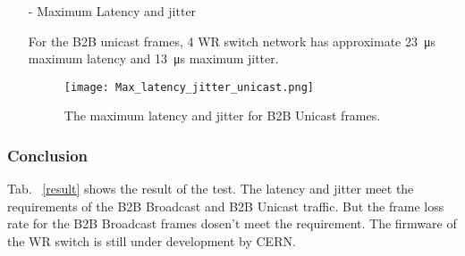 \begin{itemize}
\begin{itemize}
For the B2B Unicast frames, 4 WR switch network has approximate \SI{11}{\us} average latency and \SI{0}{\us} average jitter. 

\begin{figure}[H]
   \centering   
   \texttt{[image: Avg\_latency\_jitter\_unicast.png]}
   \caption{The average latency and jitter for B2B Unicast frames.}
   \label{Avg_latency_jitter_unicast}
\end{figure}

			\item[-] Maximum Latency and jitter

For the B2B unicast frames, 4 WR switch network has approximate \SI{23}{\us} maximum latency and \SI{13}{\us} maximum jitter.

\begin{figure}[H]
   \centering   
   \texttt{[image: Max\_latency\_jitter\_unicast.png]}
   \caption{The maximum latency and jitter for B2B Unicast frames.}
   \label{Max_latency_jitter_unicast}
\end{figure}

		\end{itemize}
\end{itemize}



\subsubsection{Conclusion}

Tab. ~\ref{result} shows the result of the test. The latency and jitter meet the requirements of the B2B Broadcast and B2B Unicast traffic. But the frame loss rate for the B2B Broadcast frames dosen't meet the requirement. The firmware of the WR switch is still under development by CERN.

